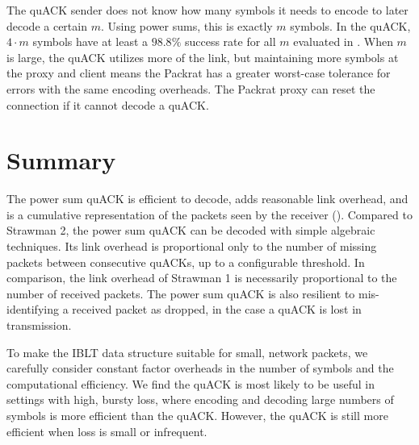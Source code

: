 The quACK sender does not know how many symbols it needs to encode to later
decode a certain $m$. Using power sums, this is exactly $m$ symbols. In
the quACK, $4 \cdot m$ symbols have at least a $\!98.8\%$ success rate for
all $m$ evaluated in . When $m$ is large, the quACK utilizes more
of the link, but maintaining more symbols at the proxy and client means
the Packrat has a greater worst-case tolerance for errors with the same encoding
overheads. The Packrat proxy can reset the connection if it cannot decode a quACK.

\section{Summary}
\label{sec:quack:summary}

The power sum quACK is efficient to decode, adds reasonable link overhead,
and is a cumulative representation of the packets seen by the receiver
().
Compared to Strawman 2, the power sum quACK can be decoded with simple
algebraic techniques.
Its link overhead is proportional only to the number of
missing packets between consecutive quACKs, up to a configurable threshold. In
comparison, the link overhead of Strawman 1 is necessarily proportional to the
number of received packets.
The power sum quACK is also resilient to mis-identifying a received packet as
dropped, in the case a quACK is lost in transmission.

To make the IBLT data structure suitable for small, network packets, we
carefully consider constant factor overheads in the
number of symbols and the computational efficiency. We find the quACK
is most likely to be useful in settings with high, bursty loss, where
encoding and decoding large numbers of symbols is more efficient than the
quACK. However, the quACK is still more efficient when
loss is small or infrequent.
